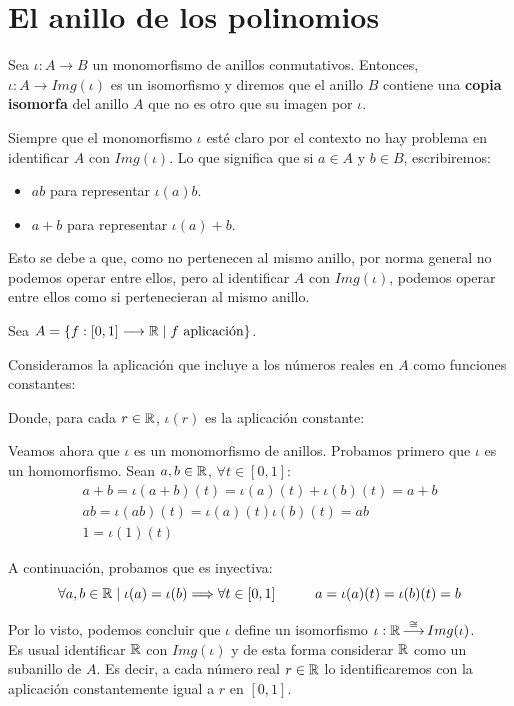 \section{El anillo de los polinomios}
\begin{definicion}
    Sea $\iota:A\longrightarrow B$ un monomorfismo de anillos conmutativos. Entonces, $\iota:A\longrightarrow Img(\iota)$ es un isomorfismo y diremos que el anillo $B$ contiene una \textbf{copia isomorfa} del anillo $A$ que no es otro que su imagen por $\iota$.
\end{definicion}


Siempre que el monomorfismo $\iota$ esté claro por el contexto no hay problema en identificar $A$ con $Img(\iota)$. Lo que
significa que si $a\in A$ y $b \in B$, escribiremos:
\begin{itemize}
    \item $ab$ para representar $\iota(a)b$.
    \item $a+b$ para representar $\iota(a)+b$.
\end{itemize}
Esto se debe a que, como no pertenecen al mismo anillo, por norma general no podemos operar entre ellos, pero al identificar $A$ con $Img(\iota)$, podemos operar entre ellos como si pertenecieran al mismo anillo.

\begin{ejemplo}
    Sea $A = \{f:[0,1]\longrightarrow \mathbb R \mid f \mbox{ aplicación}\}$.
    
    Consideramos la aplicación que incluye a los números reales en $A$ como funciones constantes:

    Donde, para cada $r \in \mathbb R$, $\iota(r)$ es la aplicación constante:
    
    Veamos ahora que $\iota$ es un monomorfismo de anillos. Probamos primero que $\iota$ es un homomorfismo. Sean $a,b \in \mathbb R$, $\forall t \in [0,1]$:
    \begin{gather*}
        a+b = \iota(a+b)(t) = \iota(a)(t) + \iota(b)(t) = a+b \\
        ab = \iota(ab)(t) = \iota(a)(t) \iota(b)(t) = ab \\
        1 = \iota(1)(t)
    \end{gather*}
    
    A continuación, probamos que es inyectiva:
    $$\forall a,b \in \mathbb R \mid \iota(a) = \iota(b) \Longrightarrow \forall t \in [0,1] \hspace{1cm} a=\iota(a)(t)=\iota(b)(t) = b$$

    
    Por lo visto, podemos concluir que $\iota$ define un isomorfismo $\displaystyle \iota:\mathbb R \mathop{\longrightarrow}^{\cong}
        Img(\iota)$.\\
        
    Es usual identificar $\mathbb R$ con $Img(\iota)$ y de esta forma considerar $\mathbb R$ como un subanillo de $A$. Es decir, a cada número real $r \in \mathbb R$ lo identificaremos con la aplicación constantemente igual a $r$ en $[0,1]$.
\end{ejemplo}

